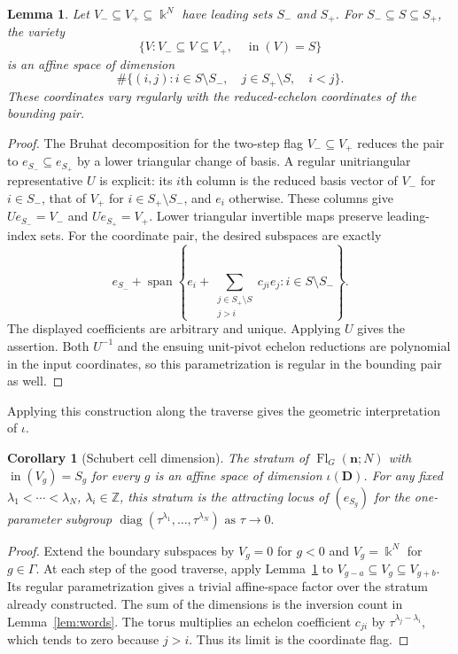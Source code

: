 \documentclass[12pt,reqno]{amsart}
\numberwithin{equation}{section}
\newtheorem{lemma}[theorem]{Lemma}
\newtheorem{corollary}[theorem]{Corollary}
\theoremstyle{definition}
\theoremstyle{remark}
\theoremstyle{plain}
\newcommand{\ZZ}{\mathbb Z}
\newcommand{\nn}{\mathbf n}
\begin{document}
\begin{lemma}\label{lem:relativecell}
Let $V_-\subseteq V_+\subseteq\Bbbk^N$ have leading sets $S_-$ and
$S_+$.  For $S_-\subseteq S\subseteq S_+$, the variety
\[
 \{V:V_-\subseteq V\subseteq V_+,\quad\operatorname{in}(V)=S\}
\]
is an affine space of dimension
\[
 \#\{(i,j):i\in S\setminus S_-,\quad j\in S_+\setminus S,\quad i<j\}.
\]
These coordinates vary regularly with the reduced-echelon coordinates
of the bounding pair.
\end{lemma}
\begin{proof}
The Bruhat decomposition for the two-step flag $V_-\subseteq V_+$
reduces the pair to $e_{S_-}\subseteq e_{S_+}$ by a lower triangular
change of basis.  A regular unitriangular representative $U$ is explicit:
its $i$th column is the reduced basis vector of $V_-$ for $i\in S_-$,
that of $V_+$ for $i\in S_+\setminus S_-$, and $e_i$ otherwise.
These columns give $Ue_{S_-}=V_-$ and $Ue_{S_+}=V_+$.
Lower triangular invertible maps preserve leading-index sets.
For the coordinate pair, the desired subspaces are exactly
\[
 e_{S_-}+\operatorname{span}\left\{
 e_i+\sum_{\substack{j\in S_+\setminus S\\j>i}}c_{ji}e_j:
 i\in S\setminus S_-\right\}.
\]
The displayed coefficients are arbitrary and unique.
Applying $U$ gives the assertion.  Both $U^{-1}$ and the ensuing
unit-pivot echelon reductions are polynomial in the input coordinates,
so this parametrization is regular in the bounding pair as well.
\end{proof}

Applying this construction along the traverse gives the geometric interpretation of $\iota$.


\begin{corollary}[Schubert cell dimension]\label{cor:flagcells}
The stratum of $\operatorname{Fl}_G(\nn;N)$ with
$\operatorname{in}(V_g)=S_g$ for every $g$ is an affine space of dimension
$\iota(\boldsymbol D)$.  For any fixed $\lambda_1<\cdots<\lambda_N$, $\lambda_i\in\ZZ$, this stratum is the attracting locus of $(e_{S_g})$ for the one-parameter subgroup
\(
 \operatorname{diag}(\tau^{\lambda_1},\ldots,\tau^{\lambda_N}) \text{ as }\tau\to0.
\)
\end{corollary}
\begin{proof}
Extend the boundary subspaces by $V_g=0$ for $g<0$ and
$V_g=\Bbbk^N$ for $g\in\Gamma$.
At each step of the good traverse, apply Lemma~\ref{lem:relativecell}
to $V_{g-a}\subseteq V_g\subseteq V_{g+b}$.
Its regular parametrization gives a trivial affine-space factor over
the stratum already constructed.  The sum of the dimensions is the
inversion count in Lemma~\ref{lem:words}.
The torus multiplies an echelon coefficient $c_{ji}$ by
$\tau^{\lambda_j-\lambda_i}$, which tends to zero because $j>i$.
Thus its limit is the coordinate flag.
\end{proof}
\end{document}
